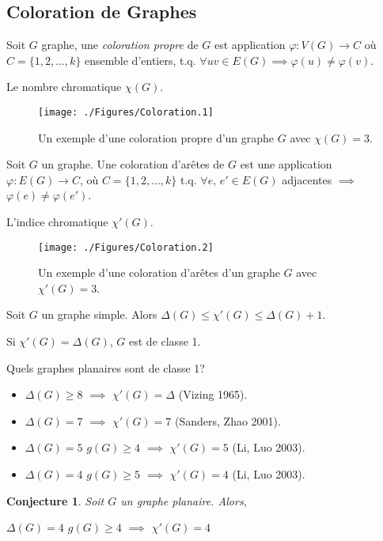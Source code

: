 \documentclass{beamer}
\newtheorem{conjecture}{Conjecture}
\begin{document}
\subsection{Coloration de Graphes}
\begin{frame}
Soit $G$ graphe, une \emph{coloration propre} de $G$ est application $\varphi: V(G) \to C$ où $C=\{1,2,...,k\}$ ensemble d'entiers, t.q. $\forall uv\in E(G) \implies\varphi(u) \neq \varphi(v)$. 

Le nombre chromatique $\chi(G)$.

\begin{figure}[ht]
\centerline{
\texttt{[image: ./Figures/Coloration.1]}
}
\caption{Un exemple d'une coloration propre d'un graphe $G$ avec $\chi(G)=3$.}
\end{figure}

\end{frame}
\begin{frame}
Soit $G$ un graphe. Une coloration d'arêtes de $G$ est une application $\varphi:E(G) \to C$, où $C=\{1,2,...,k\}$ t.q. $\forall e$, $e' \in E(G)$ adjacentes $\implies$ $\varphi(e) \neq \varphi(e')$. 

L'indice chromatique $\chi'(G)$.

\begin{figure}[ht]
\centerline{
\texttt{[image: ./Figures/Coloration.2]}
}
\caption{Un exemple d'une coloration d'arêtes d'un graphe $G$ avec $\chi'(G)=3$.}
\end{figure}
\end{frame}

\begin{frame}
\begin{theorem}[Vizing]
Soit $G$ un graphe simple. Alors $\Delta(G) \leq \chi'(G) \leq \Delta(G) + 1$.
\end{theorem}
Si $\chi'(G) = \Delta(G)$,  $G$ est de classe 1.

\pause
Quels graphes planaires sont de classe 1?
\begin{itemize}
\item $\Delta(G) \geq 8$ $\implies$ $\chi'(G)=\Delta$ (Vizing 1965).
\item $\Delta(G) = 7$ $\implies$ $\chi'(G)=7$ (Sanders, Zhao 2001).
\item $\Delta(G) = 5$ $g(G) \geq 4$ $\implies$ $\chi'(G) = 5$ (Li, Luo 2003).
\item $\Delta(G) = 4$ $g(G) \geq 5$ $\implies$ $\chi'(G) = 4$ (Li, Luo 2003).
\end{itemize}
\begin{conjecture}
Soit $G$ un graphe planaire. Alors,

$\Delta(G) = 4$ $g(G) \geq 4$ $\implies$ $\chi'(G) = 4$
\end{conjecture}
\end{frame}
\end{document}
